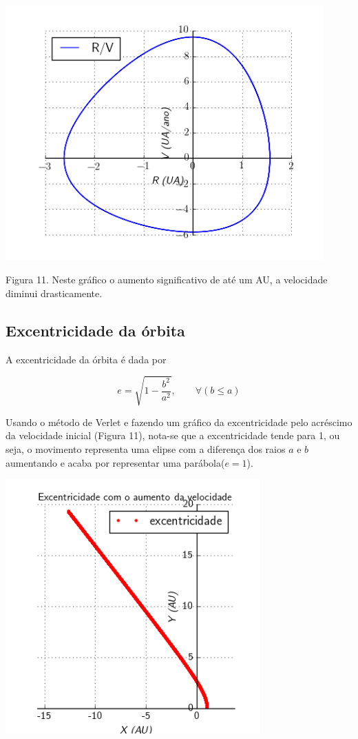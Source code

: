 \documentclass[a4paper]{article} %
\begin{document}
\begin{center}
	\includegraphics[width=4.80in,height=3.85in, keepaspectratio=false]{image4_15-51-15-338000.png}
	
	\scriptsize {Figura 11. Neste gráfico o aumento significativo de até um AU, a velocidade diminui drasticamente.}
\end{center}

\subsection{Excentricidade da órbita}

A excentricidade da órbita é dada por 

\begin{equation}
e = \sqrt{1 - \frac{b^2}{a^2}}, \qquad \forall (b\leq a)
\end{equation}

Usando o método de Verlet e fazendo um gráfico da excentricidade pelo acréscimo da velocidade inicial (Figura 11), nota-se que a excentricidade tende para 1, ou seja, o movimento representa uma elipse com a diferença dos raios $a$ e $b$ aumentando e acaba por representar uma parábola($e=1$).
\begin{center}
	\includegraphics[width=3.84in,height=3.84in]{excentricidade.png}
\end{center}
\end{document}
